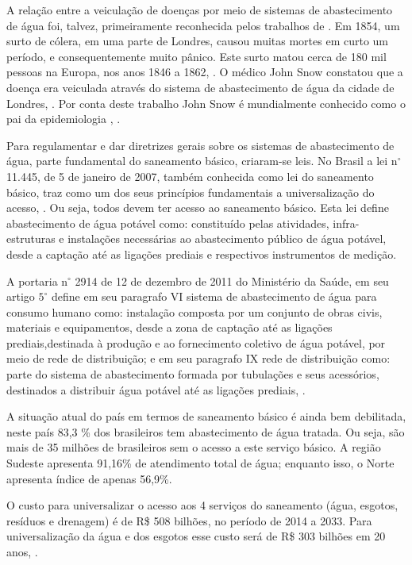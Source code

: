 \documentclass[
	12pt,				%
	openright,			%
	twoside,			%
	a4paper,			%
	english,			%
	french,				%
	spanish,			%
	brazil				%
	]{abntex2}
\begin{document}
A relação entre a veiculação de doenças por meio de sistemas de abastecimento de água foi, talvez, primeiramente reconhecida pelos trabalhos de . Em 1854, um surto de cólera, em uma parte de Londres, causou muitas mortes em curto um período, e consequentemente muito pânico. Este surto matou cerca de 180 mil pessoas na Europa, nos anos 1846 a 1862, \cite{rocha2009}. O médico John Snow constatou que a doença era veiculada através do sistema de abastecimento de água da cidade de Londres, \cite{snow1999}. Por conta deste trabalho John Snow é mundialmente conhecido como o pai da epidemiologia , \cite{susser1996}.

Para regulamentar e dar diretrizes gerais sobre os sistemas de abastecimento de água, parte fundamental do saneamento básico, criaram-se leis. No Brasil a lei n$^{\circ}$ 11.445, de 5 de janeiro de 2007, também conhecida como lei do saneamento básico, traz como um dos seus princípios fundamentais a universalização do acesso, \cite{lei11445}. Ou seja, todos devem ter acesso ao saneamento básico. Esta lei define abastecimento de água potável como: constituído pelas atividades, infra-estruturas e instalações necessárias ao abastecimento público de água potável, desde a captação até as ligações prediais e respectivos instrumentos de medição.

A portaria n$^{\circ}$  2914 de 12 de dezembro de 2011 do Ministério da Saúde, em seu artigo $5^{\circ}$ define em seu paragrafo VI sistema de abastecimento de água para consumo humano como: instalação composta por um conjunto de obras civis, materiais e equipamentos, desde a zona de captação até as ligações prediais,destinada à produção e ao fornecimento coletivo de água potável, por meio de rede de distribuição; e em seu paragrafo IX rede de distribuição como: parte do sistema de abastecimento formada por tubulações e seus acessórios, destinados a distribuir água potável até as ligações prediais, \cite{portaria2914}. 

A situação atual do país em termos de saneamento básico é ainda bem debilitada, neste país 83,3 \% dos brasileiros tem abastecimento de água tratada. Ou seja, são mais de 35 milhões de brasileiros sem o acesso a este serviço básico. A região Sudeste apresenta 91,16\% de atendimento total de água; enquanto isso, o Norte apresenta índice de apenas 56,9\%.

O custo para universalizar o acesso aos 4 serviços do saneamento (água, esgotos, resíduos e drenagem) é de R\$ 508 bilhões, no período de 2014 a 2033. Para universalização da água e dos esgotos esse custo será de R\$ 303 bilhões em 20 anos, \cite{tratabrasil2013}.
\end{document}
